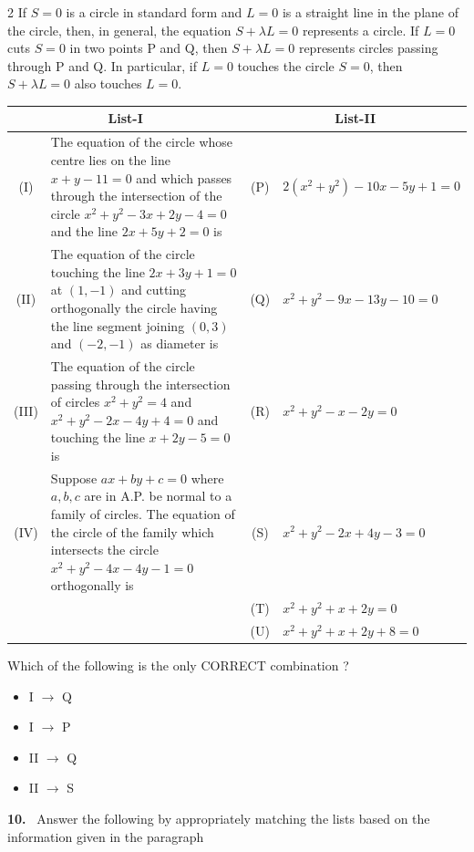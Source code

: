 \documentclass[10pt]{extarticle}
\newcommand{\qn}[1]{\par\smallskip\noindent\textbf{#1.}~}
\newenvironment{qoptions}{\begin{itemize}[leftmargin=1.8em,itemsep=1pt,topsep=2pt,label={}]}{\end{itemize}}
\newcommand{\opt}[2]{\item[(#1)] #2}
\begin{document}
\begin{multicols}{2}
If $S=0$ is a circle in standard form and $L=0$ is a straight line in the plane of the circle, then, in general, the equation $S+\lambda L=0$ represents a circle. If $L=0$ cuts $S=0$ in two points P and Q, then $S+\lambda L=0$ represents circles passing through P and Q. In particular, if $L=0$ touches the circle $S=0$, then $S+\lambda L=0$ also touches $L=0$.
\begin{center}\small\setlength{\tabcolsep}{3pt}
\begin{tabular}{|c|p{3.7cm}|c|p{2.5cm}|}
\hline
\multicolumn{2}{|c|}{List-I} & \multicolumn{2}{c|}{List-II}\\ \hline
(I) & The equation of the circle whose centre lies on the line $x+y-11=0$ and which passes through the intersection of the circle $x^2+y^2-3x+2y-4=0$ and the line $2x+5y+2=0$ is & (P) & $2(x^2+y^2)-10x-5y+1=0$\\ \hline
(II) & The equation of the circle touching the line $2x+3y+1=0$ at $(1,-1)$ and cutting orthogonally the circle having the line segment joining $(0,3)$ and $(-2,-1)$ as diameter is & (Q) & $x^2+y^2-9x-13y-10=0$\\ \hline
(III) & The equation of the circle passing through the intersection of circles $x^2+y^2=4$ and $x^2+y^2-2x-4y+4=0$ and touching the line $x+2y-5=0$ is & (R) & $x^2+y^2-x-2y=0$\\ \hline
(IV) & Suppose $ax+by+c=0$ where $a,b,c$ are in A.P. be normal to a family of circles. The equation of the circle of the family which intersects the circle $x^2+y^2-4x-4y-1=0$ orthogonally is & (S) & $x^2+y^2-2x+4y-3=0$\\ \hline
 & & (T) & $x^2+y^2+x+2y=0$\\ \hline
 & & (U) & $x^2+y^2+x+2y+8=0$\\ \hline
\end{tabular}
\end{center}
Which of the following is the only CORRECT combination ?
\begin{qoptions}
\opt{A}{I $\to$ Q}
\opt{B}{I $\to$ P}
\opt{C}{II $\to$ Q}
\opt{D}{II $\to$ S}
\end{qoptions}
\qn{10} Answer the following by appropriately matching the lists based on the information given in the paragraph


\end{multicols}
\end{document}
